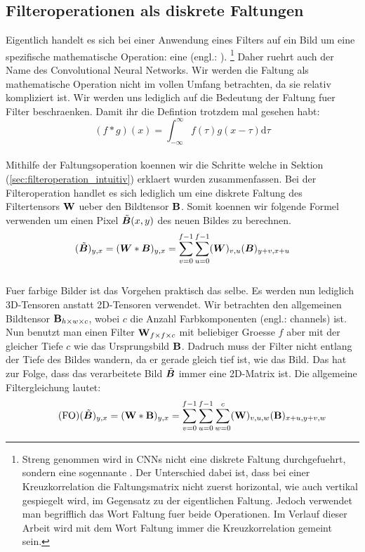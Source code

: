 \subsection{Filteroperationen als diskrete Faltungen}
Eigentlich handelt es sich bei einer Anwendung eines Filters auf ein Bild um
eine spezifische mathematische Operation: eine  (engl.:
).
\footnote{
  Streng genommen wird in CNNs nicht eine diskrete Faltung durchgefuehrt, sondern
  eine sogennante . Der Unterschied dabei ist, dass bei einer
  Kreuzkorrelation die Faltungsmatrix nicht zuerst horizontal, wie auch vertikal
  gespiegelt wird, im Gegensatz zu der eigentlichen Faltung. Jedoch verwendet man
  begrifflich das Wort Faltung fuer beide Operationen. Im Verlauf dieser Arbeit
  wird mit dem Wort Faltung immer die Kreuzkorrelation gemeint sein.
}
Daher ruehrt auch der Name des Convolutional Neural Networks.
Wir werden die Faltung als mathematische Operation nicht im vollen Umfang
betrachten, da sie relativ kompliziert ist. Wir werden uns lediglich auf die
Bedeutung der Faltung fuer Filter beschraenken.
Damit ihr die Defintion trotzdem mal gesehen habt:
\\
\begin{equation}
  (f * g)(x) = \int_{-\infty}^{\infty} f(\tau) g(x-\tau) \text{d}\tau
\end{equation}
\\
Mithilfe der Faltungsoperation koennen wir die Schritte welche in Sektion
(\ref{sec:filteroperation_intuitiv}) erklaert wurden zusammenfassen.
Bei der Filteroperation handlet es sich lediglich um eine diskrete Faltung des
Filtertensors $\mathbf{W}$ ueber den Bildtensor $\mathbf{B}$. Somit koennen wir
folgende Formel verwenden um einen Pixel $\tilde{\bm{B}}(x,y)$ des neuen Bildes zu berechnen.
\\
\begin{equation}
  (\tilde{\bm{B}})_{y,x} = (\bm{W} * \bm{B})_{y,x} = \sum_{v=0}^{f-1} \sum_{u=0}^{f-1} (\bm{W})_{v,u}(\bm{B})_{y+v,x+u}
\end{equation}
\\
Fuer farbige Bilder ist das Vorgehen praktisch das selbe. Es werden nun
lediglich 3D-Tensoren anstatt 2D-Tensoren verwendet. Wir betrachten den
allgemeinen Bildtensor $\mathbf{B}_{h \times w \times c}$, wobei $c$ die Anzahl
Farbkomponenten (engl.: channels) ist.
Nun benutzt man einen Filter $\mathbf{W}_{f \times f \times c}$ mit beliebiger Groesse
$f$ aber mit der gleicher Tiefe $c$ wie das Ursprungsbild $\mathbf{B}$.
Dadruch muss der Filter nicht entlang der Tiefe des Bildes wandern, da er
gerade gleich tief ist, wie das Bild. Das hat zur Folge, dass das verarbeitete
Bild $\tilde{\bm{B}}$ immer eine 2D-Matrix ist.
Die allgemeine Filtergleichung lautet:
\\
\begin{equation}\tag{FO}
  (\tilde{\bm{B}})_{y,x} = (\mathbf{W} * \mathbf{B})_{y,x} = \sum_{v=0}^{f-1} \sum_{u=0}^{f-1} \sum_{w=0}^c (\mathbf{W})_{v,u,w} (\mathbf{B})_{x+u,y+v,w}
\end{equation}

